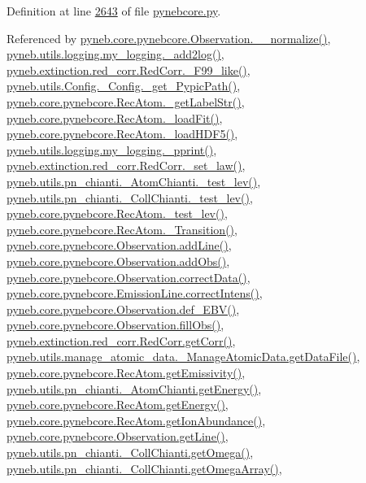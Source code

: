 Definition at line \hyperlink{pynebcore_8py_source_l02643}{2643} of file \hyperlink{pynebcore_8py_source}{pynebcore.\-py}.



Referenced by \hyperlink{pynebcore_8py_source_l04007}{pyneb.\-core.\-pynebcore.\-Observation.\-\_\-\-\_\-normalize()}, \hyperlink{logging_8py_source_l00059}{pyneb.\-utils.\-logging.\-my\-\_\-logging.\-\_\-add2log()}, \hyperlink{red__corr_8py_source_l00658}{pyneb.\-extinction.\-red\-\_\-corr.\-Red\-Corr.\-\_\-\-F99\-\_\-like()}, \hyperlink{_config_8py_source_l00115}{pyneb.\-utils.\-Config.\-\_\-\-Config.\-\_\-get\-\_\-\-Pypic\-Path()}, \hyperlink{pynebcore_8py_source_l02970}{pyneb.\-core.\-pynebcore.\-Rec\-Atom.\-\_\-get\-Label\-Str()}, \hyperlink{pynebcore_8py_source_l02754}{pyneb.\-core.\-pynebcore.\-Rec\-Atom.\-\_\-load\-Fit()}, \hyperlink{pynebcore_8py_source_l02714}{pyneb.\-core.\-pynebcore.\-Rec\-Atom.\-\_\-load\-H\-D\-F5()}, \hyperlink{logging_8py_source_l00051}{pyneb.\-utils.\-logging.\-my\-\_\-logging.\-\_\-pprint()}, \hyperlink{red__corr_8py_source_l00176}{pyneb.\-extinction.\-red\-\_\-corr.\-Red\-Corr.\-\_\-set\-\_\-law()}, \hyperlink{pn__chianti_8py_source_l00304}{pyneb.\-utils.\-pn\-\_\-chianti.\-\_\-\-Atom\-Chianti.\-\_\-test\-\_\-lev()}, \hyperlink{pn__chianti_8py_source_l00472}{pyneb.\-utils.\-pn\-\_\-chianti.\-\_\-\-Coll\-Chianti.\-\_\-test\-\_\-lev()}, \hyperlink{pynebcore_8py_source_l02672}{pyneb.\-core.\-pynebcore.\-Rec\-Atom.\-\_\-test\-\_\-lev()}, \hyperlink{pynebcore_8py_source_l02812}{pyneb.\-core.\-pynebcore.\-Rec\-Atom.\-\_\-\-Transition()}, \hyperlink{pynebcore_8py_source_l03558}{pyneb.\-core.\-pynebcore.\-Observation.\-add\-Line()}, \hyperlink{pynebcore_8py_source_l03589}{pyneb.\-core.\-pynebcore.\-Observation.\-add\-Obs()}, \hyperlink{pynebcore_8py_source_l04028}{pyneb.\-core.\-pynebcore.\-Observation.\-correct\-Data()}, \hyperlink{pynebcore_8py_source_l03447}{pyneb.\-core.\-pynebcore.\-Emission\-Line.\-correct\-Intens()}, \hyperlink{pynebcore_8py_source_l03983}{pyneb.\-core.\-pynebcore.\-Observation.\-def\-\_\-\-E\-B\-V()}, \hyperlink{pynebcore_8py_source_l03574}{pyneb.\-core.\-pynebcore.\-Observation.\-fill\-Obs()}, \hyperlink{red__corr_8py_source_l00211}{pyneb.\-extinction.\-red\-\_\-corr.\-Red\-Corr.\-get\-Corr()}, \hyperlink{manage__atomic__data_8py_source_l00297}{pyneb.\-utils.\-manage\-\_\-atomic\-\_\-data.\-\_\-\-Manage\-Atomic\-Data.\-get\-Data\-File()}, \hyperlink{pynebcore_8py_source_l02990}{pyneb.\-core.\-pynebcore.\-Rec\-Atom.\-get\-Emissivity()}, \hyperlink{pn__chianti_8py_source_l00366}{pyneb.\-utils.\-pn\-\_\-chianti.\-\_\-\-Atom\-Chianti.\-get\-Energy()}, \hyperlink{pynebcore_8py_source_l02927}{pyneb.\-core.\-pynebcore.\-Rec\-Atom.\-get\-Energy()}, \hyperlink{pynebcore_8py_source_l03083}{pyneb.\-core.\-pynebcore.\-Rec\-Atom.\-get\-Ion\-Abundance()}, \hyperlink{pynebcore_8py_source_l03665}{pyneb.\-core.\-pynebcore.\-Observation.\-get\-Line()}, \hyperlink{pn__chianti_8py_source_l00507}{pyneb.\-utils.\-pn\-\_\-chianti.\-\_\-\-Coll\-Chianti.\-get\-Omega()}, \hyperlink{pn__chianti_8py_source_l00484}{pyneb.\-utils.\-pn\-\_\-chianti.\-\_\-\-Coll\-Chianti.\-get\-Omega\-Array()}, 